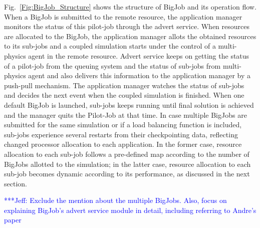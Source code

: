 \documentclass[conference,final]{IEEEtran}
\newcommand{\skonote}[1]{ {\textcolor{blue} { ***Jeff: #1 }}}
\newcommand{\skonote}[1]{}
\begin{document}
Fig.~\ref{Fig:BigJob_Structure} shows the structure of BigJob and its operation flow. When a BigJob is submitted to the remote resource, the application manager monitors the status of this pilot-job through the advert service. When resources are allocated to the BigJob, the application manager allots the obtained resources to its sub-jobs and a coupled simulation starts under the control of a multi-physics agent in the remote resource. Advert service keeps on getting the status of a pilot-job from the queuing system and the status of sub-jobs from multi-physics agent and also delivers this information to the application manager by a push-pull mechanism. The application manager watches the status of sub-jobs and decides the next event when the coupled simulation is finished. When one default BigJob is launched, sub-jobs keeps running until final solution is achieved and the manager quits the Pilot-Job at that time. In case multiple BigJobs are submitted for the same simulation or if a load balancing function is included, sub-jobs experience several restarts from their checkpointing data, reflecting changed processor allocation to each application. In the former case, resource allocation to each sub-job follows a pre-defined map according to the number of BigJobs allotted to the simulation; in the latter case, resource allocation to each sub-job becomes dynamic according to its performance, as discussed in the next section.


\skonote{Exclude the mention about the multiple BigJobs. Also, focus on explaining BigJob's advert service module in detail, including referring to Andre's paper}
\newline
\newline
\end{document}
